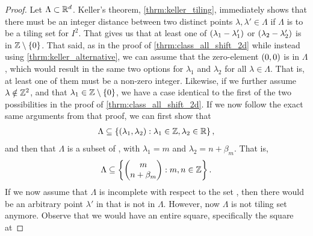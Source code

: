 \documentclass[../thesis.tex]{subfiles}
\begin{document}
\begin{proof}
    Let $\Lambda \subset \mathbb{R}^d$. Keller's theorem, \cref{thrm:keller_tiling}, immediately shows that there must be an integer distance between two distinct points $\lambda,\lambda' \in \Lambda$ if $\Lambda$ is to be a tiling set for $I^2$. That gives us that at least one of $(\lambda_1-\lambda_1')$ or $(\lambda_2-\lambda_2')$ is in $\mathbb{Z}\setminus\{0\}$. That said, as in the proof of \cref{thrm:class_all_shift_2d} while instead using \cref{thrm:keller_alternative}, we can assume that the zero-element $(0,0)$ is in $\Lambda$, which would result in the same two options for $\lambda_1$ and $\lambda_2$ for all $\lambda\in \Lambda$. That is, at least one of them must be a non-zero integer. Likewise, if we further assume $\lambda\notin \mathbb{Z}^2$, and that $\lambda_1 \in\mathbb{Z}\setminus\{0\}$, we have a case identical to the first of the two possibilities in the proof of \cref{thrm:class_all_shift_2d}. If we now follow the exact same arguments from that proof, we can first show that 
    \begin{align*}  %
        \Lambda \subseteq \braqMed{ \bracMed{\lambda_1, \lambda_2} : \lambda_1 \in \Z, \lambda_2 \in \R},
    \end{align*}
    and then that $\Lambda$ is a subset of , with $\lambda_1 = m$ and $\lambda_2 = n+\beta_m$. That is,
    \begin{equation*}  %
        \Lambda \subseteq \braqMed{\begin{pmatrix} m \\ n+\beta_m\end{pmatrix} : m,n \in \Z}.
    \end{equation*}
    If we now assume that $\Lambda$ is incomplete with respect to the set , then there would be an arbitrary point $\lambda'$ in  that is not in $\Lambda$. However, now $\Lambda$ is not tiling set anymore. Observe that we would have an entire square, specifically the square at

\end{proof}
\end{document}
